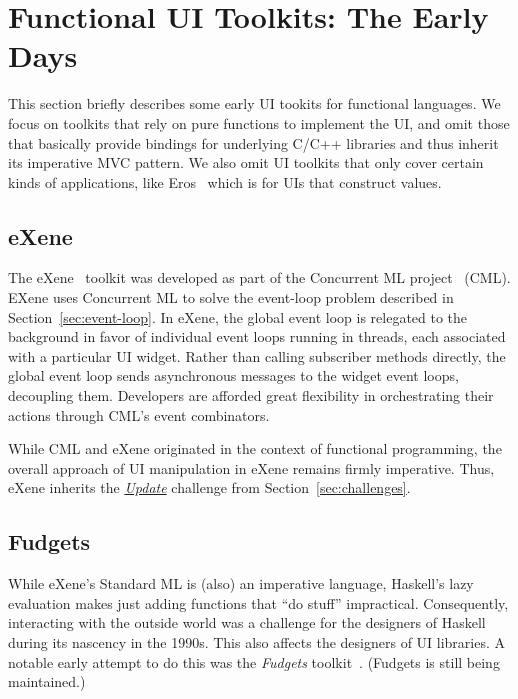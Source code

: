 \documentclass[sigplan,screen]{acmart}
\begin{document}
\section{Functional UI Toolkits: The Early Days}
\label{sec:functional-ui}

This section briefly describes some early UI tookits for functional
languages.  We focus on toolkits that rely on pure functions to implement
the UI, and omit those that basically provide bindings for
underlying C/C++ libraries and thus
inherit its imperative MVC pattern.  We also omit UI toolkits that
only cover certain kinds of applications, like Eros~\cite{Eros} which is
for UIs that construct values.

\subsection{eXene}

The eXene~\cite{eXene} toolkit was developed as part of the Concurrent
ML project~\cite{ConcurrentML} (CML).  EXene
uses Concurrent ML to solve the event-loop problem described in
Section~\ref{sec:event-loop}.  In eXene, the global event loop is
relegated to the background in favor of individual event loops running
in threads, each associated with a particular UI widget.  Rather than calling
subscriber methods directly, the global event loop sends asynchronous
messages to the widget event loops, decoupling them.  Developers
are afforded great flexibility in orchestrating their
actions through CML's event combinators.

While CML and eXene originated in the context of functional
programming, the overall approach of UI manipulation in eXene remains
firmly imperative.  Thus, eXene inherits the \hyperlink{challenge:update}{\textit{Update}} challenge from Section~\ref{sec:challenges}.

\subsection{Fudgets}

While eXene's Standard ML is (also) an imperative language,
Haskell's lazy evaluation makes just adding functions that ``do
stuff'' impractical.  Consequently, interacting with the outside world
was a challenge for the designers of Haskell during its
nascency in the 1990s.  This also affects the designers of UI
libraries.  A notable early attempt to do this was the
\textit{Fudgets} toolkit~\cite{Fudgets}.  (Fudgets is still being maintained.)
\end{document}
